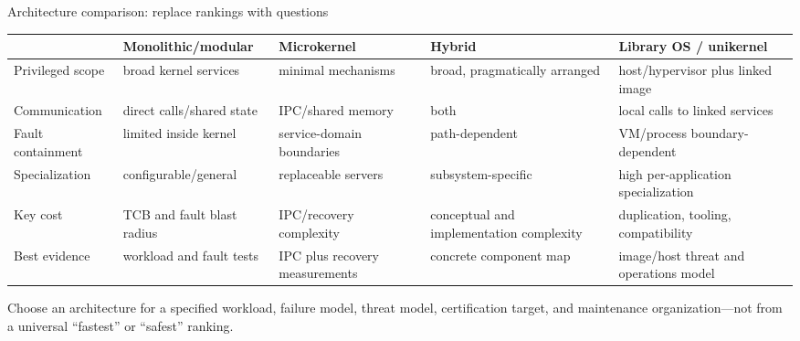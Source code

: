 \documentclass[aspectratio=169,11pt]{beamer}
\begin{document}
\begin{frame}{Architecture comparison: replace rankings with questions}
  \scriptsize
  \begin{tabularx}{\textwidth}{@{}lXXXX@{}}
    \toprule
    & \textbf{Monolithic/modular} & \textbf{Microkernel} & \textbf{Hybrid} & \textbf{Library OS / unikernel} \\
    \midrule
    Privileged scope & broad kernel services & minimal mechanisms & broad, pragmatically arranged & host/hypervisor plus linked image \\
    Communication & direct calls/shared state & IPC/shared memory & both & local calls to linked services \\
    Fault containment & limited inside kernel & service-domain boundaries & path-dependent & VM/process boundary-dependent \\
    Specialization & configurable/general & replaceable servers & subsystem-specific & high per-application specialization \\
    Key cost & TCB and fault blast radius & IPC/recovery complexity & conceptual and implementation complexity & duplication, tooling, compatibility \\
    Best evidence & workload and fault tests & IPC plus recovery measurements & concrete component map & image/host threat and operations model \\
    \bottomrule
  \end{tabularx}
  \begin{tcolorbox}[title=Decision principle]
    Choose an architecture for a specified workload, failure model, threat model, certification target, and maintenance organization---not from a universal ``fastest'' or ``safest'' ranking.
  \end{tcolorbox}
\end{frame}
\end{document}
